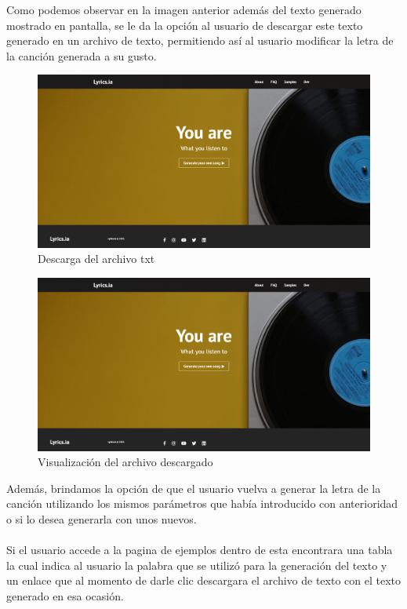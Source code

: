 \documentclass[12pt, a4paper, titlepage]{report}
\begin{document}
	Como podemos observar en la imagen anterior además del texto generado mostrado en pantalla, se le da la opción al usuario de descargar este texto generado en un archivo de texto, permitiendo así al usuario modificar la letra de la canción generada a su gusto.	
	\begin{figure}[H] 
		\includegraphics[width=13.5cm]{./Imagenes/Capturas/x.png}
		\centering \caption{Descarga del archivo txt}
	\end{figure}
	\begin{figure}[H] 
	\includegraphics[width=13.5cm]{./Imagenes/Capturas/x.png}
	\centering \caption{Visualización del archivo descargado}
	\end{figure}
	Además, brindamos la opción de que el usuario vuelva a generar la letra de la canción utilizando los mismos parámetros que había introducido con anterioridad o si lo desea generarla con unos nuevos.\\\\
	Si el usuario accede a la pagina de ejemplos dentro de esta encontrara una tabla la cual indica al usuario la palabra que se utilizó para la generación del texto y un enlace que al momento de darle clic descargara el archivo de texto con el texto generado en esa ocasión.
\end{document}
